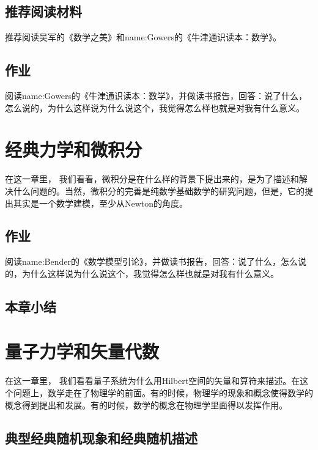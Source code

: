 \documentclass{ctexbook}
\newcommand{\ChapLabel}[1]{\label{#1}}
\begin{document}
\section{推荐阅读材料}
推荐阅读吴军的《数学之美》\cite{Wu:MathBeauty}和\gls{name:Gowers}的《牛津通识读本：数学》。


\section{作业}
\begin{Homework}			
阅读\gls{name:Gowers}的《牛津通识读本：数学》\cite{Gowers:Math}，并做读书报告，回答：说了什么，怎么说的，为什么这样说为什么说这个，我觉得怎么样也就是对我有什么意义。
\end{Homework}


\chapter{经典力学和微积分}
\ChapLabel{Chap:Calculus}
在这一章里， 我们看看，微积分是在什么样的背景下提出来的，是为了描述和解决什么问题的。当然，微积分的完善是纯数学基础数学的研究问题，但是，它的提出其实是一个数学建模，至少从Newton的角度。

\section{作业}
\begin{Homework}			
阅读\gls{name:Bender}的《数学模型引论》\cite{Bender:MathModel}，并做读书报告，回答：说了什么，怎么说的，为什么这样说为什么说这个，我觉得怎么样也就是对我有什么意义。
\end{Homework}



\section{本章小结}


\chapter{量子力学和矢量代数}
\ChapLabel{Chap:Vector}

在这一章里， 我们看看量子系统为什么用Hilbert空间的矢量和算符来描述。在这个问题上，数学走在了物理学的前面。有的时候，物理学的现象和概念使得数学的概念得到提出和发展。有的时候，数学的概念在物理学里面得以发挥作用。
\section{典型经典随机现象和经典随机描述}
\end{document}
